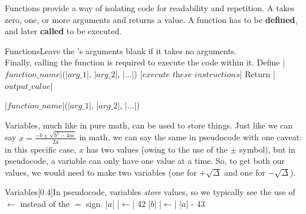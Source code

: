 \documentclass[12pt,a4paper,titlepage]{article}
\begin{document}
\begin{SummaryBox}[title=Concepts of pseudocode, breakable]
                \begin{SummaryExtensionBox}[title=Functions]
                    Functions provide a way of isolating code for readability and repetition. A  takes zero, one, or more arguments and returns a value. A function has to be \textbf{defined}, and later \textbf{called} to be executed.
                    \begin{codeboxwithcomment}{Functions}{Leave the 's arguments blank if it takes no arguments.\vspace{0.65\baselineskip}\\Finally, calling the function is required to execute the code within it.}
                        Define |\( \textit{function\_name} \)|(|\( \textit{arg\_1} \)|, |\( \textit{arg\_2} \)|, |\( \dots \)|)
                            |\( \textit{execute these instructions} \)|
                            Return |\( \textit{output\_value} \)|
                        
                        |\( \textit{function\_name} \)|(|\( \textit{arg\_1} \)|, |\( \textit{arg\_2} \)|, |\( \dots \)|)
                    \end{codeboxwithcomment}
                \end{SummaryExtensionBox}
                
                \begin{SummaryExtensionBox}[title=Variables]
                    Variables, much like in pure math, can be used to store things. Just like we can say \( x = \frac{-b \pm \sqrt{b^2 - 4ac}}{2a} \) in math, we can say the same in pseudocode with one caveat: in this specific case, \( x \) has two values (owing to the use of the \( \pm \) symbol), but in pseudocode, a variable can only have one value at a time. So, to get both our values, we would need to make two variables (one for \( +\sqrt{\Delta} \) and one for \( -\sqrt{\Delta} \)).
                    \begin{codeboxwithcomment}{Variables}[0.4\linewidth]{In pseudocode, variables \textit{store} values, so we typically see the use of \( \leftarrow \) instead of the \( = \) sign.}
                        |\( a \)| |\( \leftarrow \)| 42
                        |\( b \)| |\( \leftarrow \)| |\( a \)| - 43
                    \end{codeboxwithcomment}
                \end{SummaryExtensionBox}


\end{SummaryBox}
\end{document}
